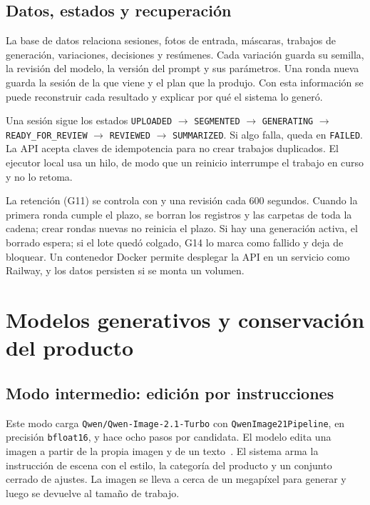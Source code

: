 \documentclass[11pt,a4paper]{article}
\newcommand{\ruta}[1]{{\small\texttt{\detokenize{#1}}}}
\begin{document}
\subsection{Datos, estados y recuperación}
La base de datos relaciona sesiones, fotos de entrada, máscaras, trabajos de generación, variaciones, decisiones y resúmenes. Cada variación guarda su semilla, la revisión del modelo, la versión del prompt y sus parámetros. Una ronda nueva guarda la sesión de la que viene y el plan que la produjo. Con esta información se puede reconstruir cada resultado y explicar por qué el sistema lo generó.

Una sesión sigue los estados \texttt{UPLOADED} $\rightarrow$ \texttt{SEGMENTED} $\rightarrow$ \texttt{GENERATING} $\rightarrow$ \texttt{READY\_FOR\_REVIEW} $\rightarrow$ \texttt{REVIEWED} $\rightarrow$ \texttt{SUMMARIZED}. Si algo falla, queda en \texttt{FAILED}. La API acepta claves de idempotencia para no crear trabajos duplicados. El ejecutor local usa un hilo, de modo que un reinicio interrumpe el trabajo en curso y no lo retoma.

La retención (G11) se controla con \ruta{SESSION_RETENTION_HOURS=24} y una revisión cada 600 segundos. Cuando la primera ronda cumple el plazo, se borran los registros y las carpetas de toda la cadena; crear rondas nuevas no reinicia el plazo. Si hay una generación activa, el borrado espera; si el lote quedó colgado, G14 lo marca como fallido y deja de bloquear. Un contenedor Docker permite desplegar la API en un servicio como Railway, y los datos persisten si se monta un volumen.

\clearpage
\section{Modelos generativos y conservación del producto}
\subsection{Modo intermedio: edición por instrucciones}
Este modo carga \texttt{Qwen/Qwen-Image-2.1-Turbo} con \texttt{QwenImage21Pipeline}, en precisión \texttt{bfloat16}, y hace ocho pasos por candidata. El modelo edita una imagen a partir de la propia imagen y de un texto~\cite{qwen}. El sistema arma la instrucción de escena con el estilo, la categoría del producto y un conjunto cerrado de ajustes. La imagen se lleva a cerca de un megapíxel para generar y luego se devuelve al tamaño de trabajo.
\end{document}
